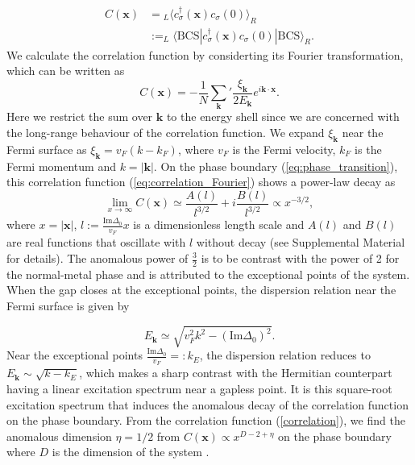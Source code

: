 \documentclass[aps,prl,twocolumn,nofootinbib,superscriptaddress,notitlepage,longbibliography]{revtex4-1}
\begin{document}
	\begin{align}
	C(\bm{x})&={}_{L}\langle c_{\sigma}^{\dagger}(\bm{x})c_{\sigma}(0)\rangle_{R}\nonumber\\
	&:=_{L}\langle\text{BCS}|c_{\sigma}^{\dagger}(\bm{x})c_{\sigma}(0)|\text{BCS}\rangle_{R}.
	\end{align}
 We calculate the correlation function by considerting its Fourier transformation, which can be written as
 \begin{equation}
 	C (\bm{x}) = -\frac{1}{N}\sum_{\bm{k}}^{}{'} \frac{\xi_{\bm{k}}}{2 E_{\bm{k}}} e^{i\bm{k} \cdot \bm{x}}.\label{eq:correlation_Fourier}
 \end{equation}
  Here we restrict the sum over $\bm{k}$ to the energy shell since we are concerned with the long-range behaviour of the correlation function. We expand $\xi_{\bm{k}}$ near the Fermi surface as $\xi_{{\bm{k}}}=v_F(k-k_F)$, where $v_F$ is the Fermi velocity, $k_F$ is the Fermi momentum and $k=|\bm{k}|$. On the phase boundary (\ref{eq:phase_transition}), this correlation function (\ref{eq:correlation_Fourier}) shows a power-law decay as
	\begin{equation}
	\lim_{x\rightarrow\infty}C (\bm{x})\simeq\frac{A(l)}{l^{3/2}}+i\frac{B(l)}{l^{3/2}}\propto x^{-3/2},\label{correlation}
	\end{equation}
	where $x=|\bm{x}|$, $l:=\frac{\text{Im}\Delta_{0}}{v_{F}}x$ is a dimensionless length scale and $A(l)$ and $B(l)$ are real functions  that oscillate with $l$ without decay (see Supplemental Material \cite{SupplementaryMaterial} for details). The anomalous power of $\frac{3}{2}$ is to be contrast with the power of 2 for the normal-metal phase \cite{Sachdev:2011uj} and is attributed to the exceptional points of the system.  When the gap closes at the exceptional points, the dispersion relation near the Fermi surface is given by
	
	\begin{equation}
	E_{\bm{k}}\simeq\sqrt{v_{F}^{2}k^{2}-(\text{Im}\Delta_{0})^{2}}.
	\end{equation}
	Near the exceptional points $\frac{\text{Im}\Delta_{0}}{v_{F}}=:k_{E}$,
	the dispersion relation reduces to $E_{\bm{k}}\sim\sqrt{k-k_{E}}$,
	which makes a sharp contrast with the Hermitian counterpart having a
	linear excitation spectrum near a gapless point. It is this square-root
	excitation spectrum that induces the
	anomalous decay of the correlation function on the phase boundary. From the correlation function (\ref{correlation}), we find the anomalous dimension $\eta=1/2$ from $C(\bm{x})\propto x^{D-2+\eta}$ on the phase boundary where $D$ is the dimension of the system \cite{Sachdev:2011uj}.
	
\end{document}
